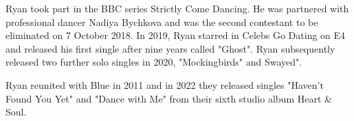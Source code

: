 \documentclass{LaporanPKL}
\begin{document}
\DaftarIsi
\DaftarGambar
\DaftarTabel

\newpage

\Inti







\nocite{*}
\BukaLampiran
{}
Ryan took part in the BBC series Strictly Come Dancing. He was partnered with professional dancer Nadiya Bychkova and was the second contestant to be eliminated on 7 October 2018. In 2019, Ryan starred in Celebs Go Dating on E4 and released his first single after nine years called "Ghost". Ryan subsequently released two further solo singles in 2020, "Mockingbirds" and Swayed".

Ryan reunited with Blue in 2011 and in 2022 they released singles "Haven't Found You Yet" and "Dance with Me" from their sixth studio album Heart \& Soul.


\end{document}
